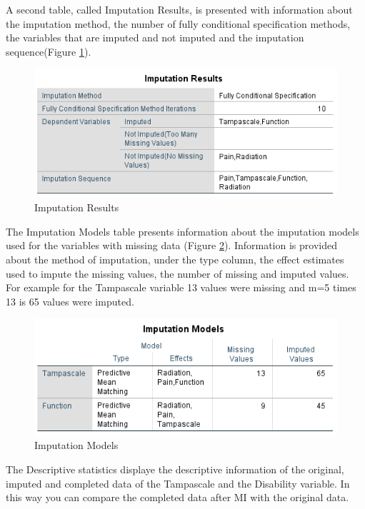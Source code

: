\documentclass[]{book}
\theoremstyle{definition}
\theoremstyle{definition}
\theoremstyle{definition}
\theoremstyle{remark}
\begin{document}
A second table, called Imputation Results, is presented with information
about the imputation method, the number of fully conditional
specification methods, the variables that are imputed and not imputed
and the imputation sequence(Figure \ref{fig:tab4-5}).

\begin{figure}

{\centering \includegraphics[width=0.9\linewidth]{images/tab4.5} 

}

\caption{Imputation Results}\label{fig:tab4-5}
\end{figure}

The Imputation Models table presents information about the imputation
models used for the variables with missing data (Figure
\ref{fig:tab4-6}). Information is provided about the method of
imputation, under the type column, the effect estimates used to impute
the missing values, the number of missing and imputed values. For
example for the Tampascale variable 13 values were missing and m=5 times
13 is 65 values were imputed.

\begin{figure}

{\centering \includegraphics[width=0.9\linewidth]{images/tab4.6} 

}

\caption{Imputation Models}\label{fig:tab4-6}
\end{figure}

The Descriptive statistics displaye the descriptive information of the
original, imputed and completed data of the Tampascale and the
Disability variable. In this way you can compare the completed data
after MI with the original data.
\end{document}
